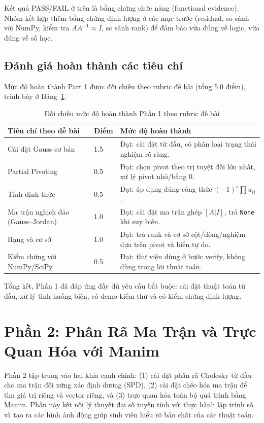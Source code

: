 \documentclass[a4paper]{article}
\begin{document}
Kết quả PASS/FAIL ở trên là bằng chứng chức năng (functional evidence). Nhóm kết hợp thêm bằng chứng định lượng ở các mục trước (residual, so sánh với NumPy, kiểm tra \(AA^{-1}\approx I\), so sánh rank) để đảm bảo vừa đúng về logic, vừa đúng về số học.

\subsection{Đánh giá hoàn thành các tiêu chí}

Mức độ hoàn thành Part 1 được đối chiếu theo rubric đề bài (tổng 5.0 điểm), trình bày ở Bảng~\ref{tab:part1_rubric}.

\begin{table}[H]
\centering
\small
\begin{tabular}{|p{}|p{}|p{}|}
\hline
\textbf{Tiêu chí theo đề bài} & \textbf{Điểm} & \textbf{Mức độ hoàn thành} \\ \hline
Cài đặt Gauss cơ bản & 1.5 & Đạt: cài đặt từ đầu, có phân loại trạng thái nghiệm rõ ràng. \\ \hline
Partial Pivoting & 0.5 & Đạt: chọn pivot theo trị tuyệt đối lớn nhất, xử lý pivot nhỏ/bằng 0. \\ \hline
Tính định thức & 0.5 & Đạt: áp dụng đúng công thức \((-1)^s\prod u_{ii}\). \\ \hline
Ma trận nghịch đảo (Gauss--Jordan) & 1.0 & Đạt: cài đặt ma trận ghép \([A|I]\), trả \texttt{None} khi suy biến. \\ \hline
Hạng và cơ sở & 1.0 & Đạt: trả rank và cơ sở cột/dòng/nghiệm dựa trên pivot và biến tự do. \\ \hline
Kiểm chứng với NumPy/SciPy & 0.5 & Đạt: thư viện dùng ở bước verify, không dùng trong lõi thuật toán. \\ \hline
\end{tabular}
\caption{Đối chiếu mức độ hoàn thành Phần 1 theo rubric đề bài}
\label{tab:part1_rubric}
\end{table}

Tổng kết, Phần 1 đã đáp ứng đầy đủ yêu cầu bắt buộc: cài đặt thuật toán từ đầu, xử lý tình huống biên, có demo kiểm thử và có kiểm chứng định lượng.

\section{Phần 2: Phân Rã Ma Trận và Trực Quan Hóa với Manim}

Phần 2 tập trung vào hai khía cạnh chính: (1) cài đặt phân rã Cholesky từ đầu cho ma trận đối xứng xác định dương (SPD), (2) cài đặt chéo hóa ma trận để tìm giá trị riêng và vector riêng, và (3) trực quan hóa toàn bộ quá trình bằng Manim. Phần này kết nối lý thuyết đại số tuyến tính với thực hành lập trình số và tạo ra các hình ảnh động giúp sinh viên hiểu rõ bản chất của các thuật toán.
\end{document}

